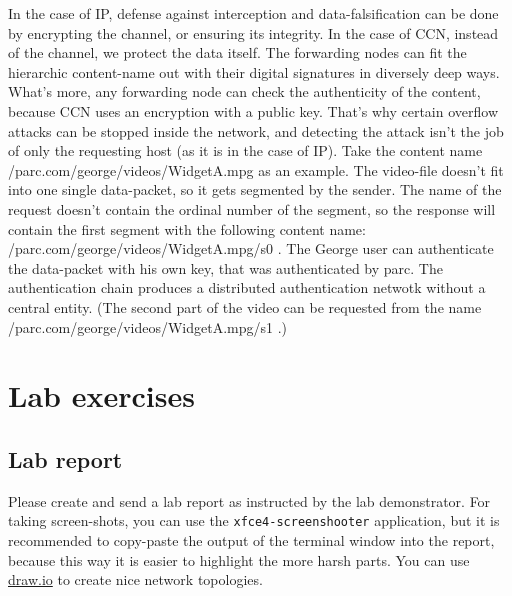 \documentclass[a4paper]{article}
\begin{document}
In the case of IP, defense against interception and data-falsification can be done by encrypting the
channel, or ensuring its integrity. In the case of CCN, instead of the channel, we protect the
data itself. The forwarding nodes can fit the hierarchic content-name out with their digital 
signatures in diversely deep ways. What's more, any forwarding node can check the authenticity of the
content, because CCN uses an encryption with a public key. That's why certain overflow attacks can be
stopped inside the network, and detecting the attack isn't the job of only the requesting host (as 
it is in the case of IP). Take the content name /parc.com/george/videos/WidgetA.mpg as an example.
The video-file doesn't fit into one single data-packet, so it gets segmented by the sender. The name
of the request doesn't contain the ordinal number of the segment, so the response will contain the
first segment with the following content name: /parc.com/george/videos/WidgetA.mpg/s0 . The George
user can authenticate the data-packet with his own key, that was authenticated by parc. The 
authentication chain produces a distributed authentication netwotk without a central entity. (The 
second part of the video can be requested from the name /parc.com/george/videos/WidgetA.mpg/s1 .)





\appendix

\section{Lab exercises}


\subsection{Lab report}

Please create and send a lab report as instructed by the lab demonstrator. For taking screen-shots, you can use the \verb!xfce4-screenshooter! application, but it is 
recommended to copy-paste the output of the terminal window into the report, because this way it is
easier to highlight the more harsh parts. You can use \href{https://www.draw.io/}{draw.io} to create nice network topologies.
\end{document}
